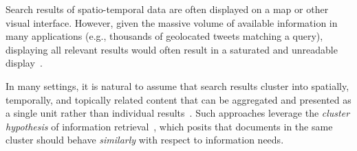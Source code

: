 Search results of spatio-temporal data are often displayed on a map or other visual interface.  However, given the massive volume of available information in many applications (e.g., thousands of geolocated tweets matching a query), displaying all relevant results would often result in a saturated and unreadable display~\cite{Landesberger2011,Liu2014,Sun2013}.





In many settings, it is natural to assume that search results  cluster into spatially, temporally, and topically related content that can be aggregated and presented as a single unit rather than individual results~\cite{Manning2008}.  
Such approaches leverage the \emph{cluster hypothesis} of information retrieval~\cite{Salton1971,Jardine1971,Voorhees1985,Manning2008}, which posits that documents in the same cluster should behave \emph{similarly} with respect to information needs.  

